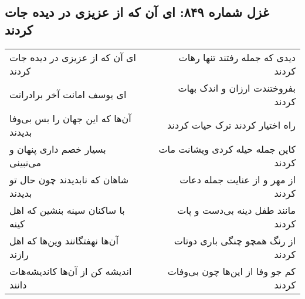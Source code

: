 \begin{center}
\section*{غزل شماره ۸۴۹: ای آن که از عزیزی در دیده جات کردند}
\label{sec:0849}
\begin{longtable}{l p{0.5cm} r}
ای آن که از عزیزی در دیده جات کردند
&&
دیدی که جمله رفتند تنها رهات کردند
\\
ای یوسف امانت آخر برادرانت
&&
بفروختندت ارزان و اندک بهات کردند
\\
آن‌ها که این جهان را بس بی‌وفا بدیدند
&&
راه اختیار کردند ترک حیات کردند
\\
بسیار خصم داری پنهان و می‌نبینی
&&
کاین جمله حیله کردی ویشانت مات کردند
\\
شاهان که نابدیدند چون حال تو بدیدند
&&
از مهر و از عنایت جمله دعات کردند
\\
با ساکنان سینه بنشین که اهل کینه
&&
مانند طفل دینه بی‌دست و پات کردند
\\
آن‌ها نهفتگانند وین‌ها که اهل رازند
&&
از رنگ همچو چنگی باری دوتات کردند
\\
اندیشه کن از آن‌ها کاندیشه‌هات دانند
&&
کم جو وفا از این‌ها چون بی‌وفات کردند
\\
\end{longtable}
\end{center}
